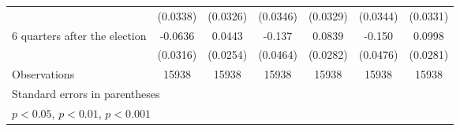 \begin{table}[htbp]
\begin{tabular}{l*{6}{c}}
                    &    (0.0338)         &    (0.0326)         &    (0.0346)         &    (0.0329)         &    (0.0344)         &    (0.0331)         \\
[1em]
 6 quarters after the election&     -0.0636\sym{*}  &      0.0443         &      -0.137\sym{**} &      0.0839\sym{**} &      -0.150\sym{**} &      0.0998\sym{***}\\
                    &    (0.0316)         &    (0.0254)         &    (0.0464)         &    (0.0282)         &    (0.0476)         &    (0.0281)         \\
\hline
Observations        &       15938         &       15938         &       15938         &       15938         &       15938         &       15938         \\
\hline\hline
\multicolumn{7}{l}{\footnotesize Standard errors in parentheses}\\
\multicolumn{7}{l}{\footnotesize \sym{*} \(p<0.05\), \sym{**} \(p<0.01\), \sym{***} \(p<0.001\)}\\
\end{tabular}
\end{table}
